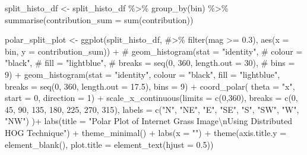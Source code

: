 \documentclass[
  letterpaper,
  DIV=11,
  numbers=noendperiod]{scrreprt}
\newenvironment{Shaded}{\begin{snugshade}}{\end{snugshade}}
\newcommand{\AttributeTok}[1]{\textcolor[rgb]{0.40,0.45,0.13}{#1}}
\newcommand{\CommentTok}[1]{\textcolor[rgb]{0.37,0.37,0.37}{#1}}
\newcommand{\DecValTok}[1]{\textcolor[rgb]{0.68,0.00,0.00}{#1}}
\newcommand{\FloatTok}[1]{\textcolor[rgb]{0.68,0.00,0.00}{#1}}
\newcommand{\FunctionTok}[1]{\textcolor[rgb]{0.28,0.35,0.67}{#1}}
\newcommand{\NormalTok}[1]{\textcolor[rgb]{0.00,0.23,0.31}{#1}}
\newcommand{\OtherTok}[1]{\textcolor[rgb]{0.00,0.23,0.31}{#1}}
\newcommand{\SpecialCharTok}[1]{\textcolor[rgb]{0.37,0.37,0.37}{#1}}
\newcommand{\StringTok}[1]{\textcolor[rgb]{0.13,0.47,0.30}{#1}}
\begin{document}
\begin{Shaded}
\begin{Highlighting}[]
\NormalTok{split\_histo\_df }\OtherTok{\textless{}{-}}
\NormalTok{  split\_histo\_df }\SpecialCharTok{\%\textgreater{}\%}
  \FunctionTok{group\_by}\NormalTok{(bin) }\SpecialCharTok{\%\textgreater{}\%}
  \FunctionTok{summarise}\NormalTok{(}\AttributeTok{contribution\_sum =} \FunctionTok{sum}\NormalTok{(contribution))}



\NormalTok{polar\_split\_plot }\OtherTok{\textless{}{-}}
  \FunctionTok{ggplot}\NormalTok{(split\_histo\_df, }\CommentTok{\#\textgreater{}\% filter(mag \textgreater{}= 0.3), }
         \FunctionTok{aes}\NormalTok{(}\AttributeTok{x =}\NormalTok{ bin, }\AttributeTok{y =}\NormalTok{ contribution\_sum)) }\SpecialCharTok{+}
  \CommentTok{\# geom\_histogram(stat = "identity", }
  \CommentTok{\#                colour = "black", }
  \CommentTok{\#                fill = "lightblue", }
  \CommentTok{\#                breaks = seq(0, 360, length.out = 30),}
  \CommentTok{\#                bins = 9) +}
  \FunctionTok{geom\_histogram}\NormalTok{(}\AttributeTok{stat =} \StringTok{"identity"}\NormalTok{,}
                 \AttributeTok{colour =} \StringTok{"black"}\NormalTok{, }
                 \AttributeTok{fill =} \StringTok{"lightblue"}\NormalTok{, }
                 \AttributeTok{breaks =} \FunctionTok{seq}\NormalTok{(}\DecValTok{0}\NormalTok{, }\DecValTok{360}\NormalTok{, }\AttributeTok{length.out =} \FloatTok{17.5}\NormalTok{),}
                 \AttributeTok{bins =} \DecValTok{9}\NormalTok{) }\SpecialCharTok{+}
  \FunctionTok{coord\_polar}\NormalTok{(}
    \AttributeTok{theta =} \StringTok{"x"}\NormalTok{, }\AttributeTok{start =} \DecValTok{0}\NormalTok{, }\AttributeTok{direction =} \DecValTok{1}\NormalTok{) }\SpecialCharTok{+}
  \FunctionTok{scale\_x\_continuous}\NormalTok{(}\AttributeTok{limits =} \FunctionTok{c}\NormalTok{(}\DecValTok{0}\NormalTok{,}\DecValTok{360}\NormalTok{),}
    \AttributeTok{breaks =} \FunctionTok{c}\NormalTok{(}\DecValTok{0}\NormalTok{, }\DecValTok{45}\NormalTok{, }\DecValTok{90}\NormalTok{, }\DecValTok{135}\NormalTok{, }\DecValTok{180}\NormalTok{, }\DecValTok{225}\NormalTok{, }\DecValTok{270}\NormalTok{, }\DecValTok{315}\NormalTok{), }
    \AttributeTok{labels =} \FunctionTok{c}\NormalTok{(}\StringTok{"N"}\NormalTok{, }\StringTok{"NE"}\NormalTok{, }\StringTok{"E"}\NormalTok{, }\StringTok{"SE"}\NormalTok{, }\StringTok{"S"}\NormalTok{, }\StringTok{"SW"}\NormalTok{, }\StringTok{"W"}\NormalTok{, }\StringTok{"NW"}\NormalTok{)}
\NormalTok{  )}\SpecialCharTok{+}
  \FunctionTok{labs}\NormalTok{(}\AttributeTok{title =} \StringTok{"Polar Plot of Internet Grass Image}\SpecialCharTok{\textbackslash{}n}\StringTok{Using Distributed HOG Technique"}\NormalTok{) }\SpecialCharTok{+}
  \FunctionTok{theme\_minimal}\NormalTok{() }\SpecialCharTok{+}
  \FunctionTok{labs}\NormalTok{(}\AttributeTok{x =} \StringTok{""}\NormalTok{) }\SpecialCharTok{+}
  \FunctionTok{theme}\NormalTok{(}\AttributeTok{axis.title.y =} \FunctionTok{element\_blank}\NormalTok{(),}
        \AttributeTok{plot.title =} \FunctionTok{element\_text}\NormalTok{(}\AttributeTok{hjust =} \FloatTok{0.5}\NormalTok{))}
\end{Highlighting}
\end{Shaded}
\end{document}
